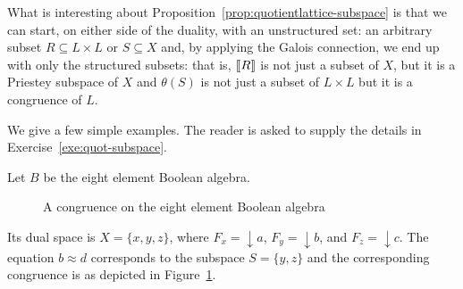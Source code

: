\begin{remark}
What is interesting about Proposition~\ref{prop:quotientlattice-subspace} is that we can start, on either side of the duality, with an unstructured set: an arbitrary subset $R\subseteq L\times L$ or $S\subseteq X$ and, by applying the Galois connection, we end up with only the structured subsets: that is, $\llbracket {R} \rrbracket$ is not just a subset of $X$, but it is a Priestey subspace of $X$ and $\theta(S)$ is not just a subset of $L\times L$ but it is a congruence of $L$.
\end{remark}

We give a few simple examples. The reader is asked to supply the details in Exercise~\ref{exe:quot-subspace}.

\begin{example}\label{exa:quot-subspace1}
Let $B$ be the eight element Boolean algebra. 
\begin{figure}[htp]
\begin{center}
\end{center}
\caption{A congruence on the eight element Boolean algebra}
\label{fig:quot-subspace1}
\end{figure}
Its dual space is $X=\{x,y,z\}$, where $F_x={\downarrow}a$, $F_y={\downarrow}b$, and $F_z={\downarrow}c$. The equation $b\approx d$ corresponds to the subspace $S=\{y,z\}$ and the corresponding congruence is as depicted in Figure~\ref{fig:quot-subspace1}.
\end{example}

